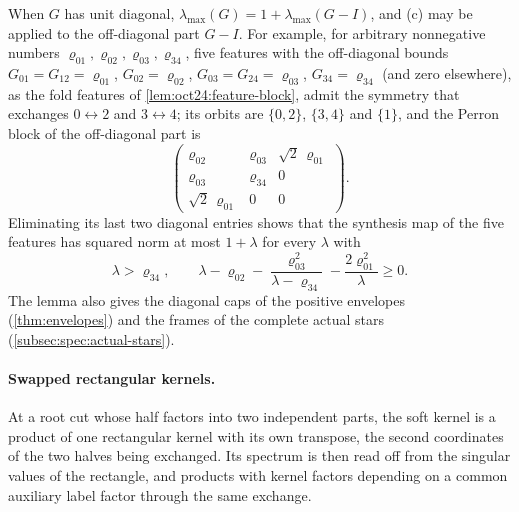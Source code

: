 When $G$ has unit diagonal, $\lambda_{\max}(G)=1+\lambda_{\max}(G-I)$, and (c)
may be applied to the off-diagonal part $G-I$. For example, for
arbitrary nonnegative numbers $\varrho_{01},\varrho_{02},
\varrho_{03},\varrho_{34}$, five features with the off-diagonal
bounds $G_{01}=G_{12}=\varrho_{01}$, $G_{02}=\varrho_{02}$,
$G_{03}=G_{24}=\varrho_{03}$, $G_{34}=\varrho_{34}$ (and zero elsewhere), as
the fold features of \cref{lem:oct24:feature-block}, admit the symmetry that
exchanges $0\leftrightarrow2$ and $3\leftrightarrow4$; its orbits are
$\{0,2\}$, $\{3,4\}$ and $\{1\}$, and the Perron block of the off-diagonal part
is
\[
  \begin{pmatrix}\varrho_{02}&\varrho_{03}&\sqrt2\,\varrho_{01}\\
  \varrho_{03}&\varrho_{34}&0\\ \sqrt2\,\varrho_{01}&0&0\end{pmatrix}.
\]
Eliminating its last two diagonal entries shows that the synthesis map of the
five features has squared norm at most $1+\lambda$ for every $\lambda$ with
\[
  \lambda>\varrho_{34},\qquad
  \lambda-\varrho_{02}-\frac{\varrho_{03}^2}{\lambda-\varrho_{34}}
  -\frac{2\varrho_{01}^2}\lambda\ge0 .
\]
The lemma also gives the diagonal caps of the positive envelopes
(\cref{thm:envelopes}) and the frames of the complete actual stars
(\cref{subsec:spec:actual-stars}).

\paragraph{Swapped rectangular kernels.}
At a root cut whose half factors into two independent parts, the soft kernel is
a product of one rectangular kernel with its own transpose, the second coordinates of the two halves being exchanged. Its spectrum is then read off from the singular
values of the rectangle, and products with kernel factors depending on a common auxiliary label
factor through the same exchange.

